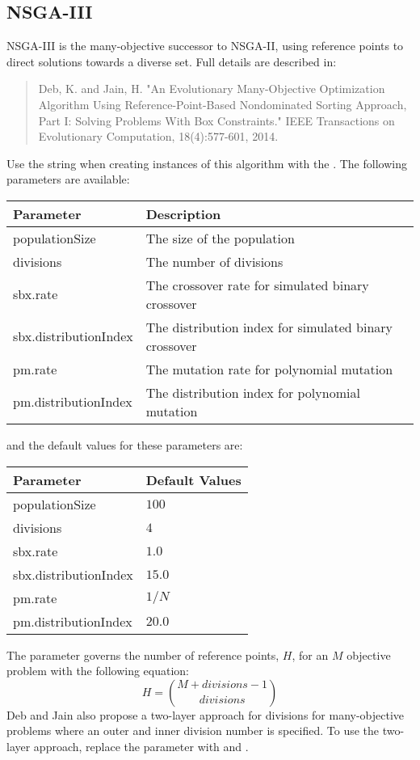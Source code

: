 \subsection{NSGA-III}
NSGA-III is the many-objective successor to NSGA-II, using reference points to direct solutions towards a diverse set.  Full details are described in:
\begin{quote}
Deb, K. and Jain, H.  "An Evolutionary Many-Objective Optimization Algorithm Using Reference-Point-Based Nondominated Sorting Approach, Part I: Solving Problems With Box Constraints."  IEEE Transactions on Evolutionary Computation, 18(4):577-601, 2014.
\end{quote}
Use the string  when creating instances of this algorithm with the .  The following parameters are available:
\newline
\newline
\begin{tabularx}{\linewidth}{lX}
  \hline
  Parameter & Description \\
  \hline
  populationSize & The size of the population \\
  divisions & The number of divisions \\
  sbx.rate & The crossover rate for simulated binary crossover \\
  sbx.distributionIndex & The distribution index for simulated binary crossover \\
  pm.rate & The mutation rate for polynomial mutation \\
  pm.distributionIndex & The distribution index for polynomial mutation \\
  \hline
\end{tabularx}
\newline
\newline
and the default values for these parameters are:
\newline
\newline
\begin{tabularx}{\linewidth}{lX}
  \hline
  Parameter & Default Values \\
  \hline
  populationSize & $100$ \\
  divisions & $4$ \\
  sbx.rate & $1.0$ \\
  sbx.distributionIndex & $15.0$ \\
  pm.rate & $1/N$ \\
  pm.distributionIndex & $20.0$ \\
  \hline
\end{tabularx}
\newline
\newline
The  parameter governs the number of reference points, $H$, for an $M$ objective problem with the following equation:
\begin{equation}
  H = {M+divisions-1 \choose divisions}
\end{equation}
Deb and Jain also propose a two-layer approach for divisions for many-objective problems where an outer and inner division number is specified.  To use the two-layer approach, replace the  parameter with  and .

